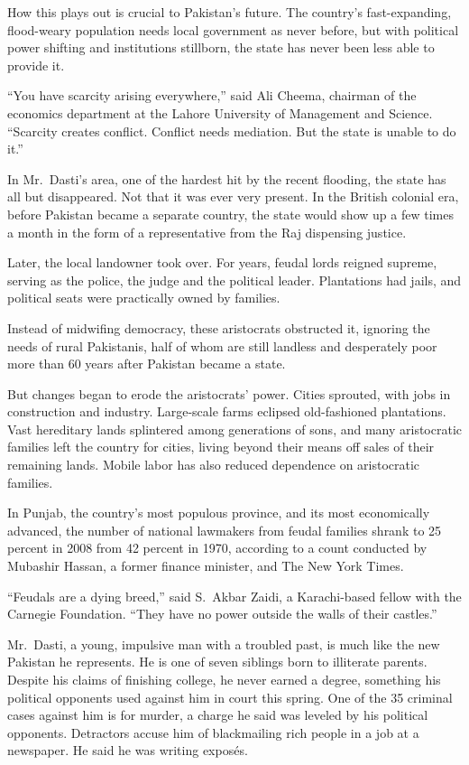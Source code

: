 ﻿\documentclass[12pt]{article}
\begin{document}
How this plays out is crucial to Pakistan's future. The country's fast-expanding, flood-weary
population needs local government as never before, but with political power shifting and
institutions stillborn, the state has never been less able to provide it.

``You have scarcity arising everywhere,'' said Ali Cheema, chairman of the economics department at
the Lahore University of Management and Science. ``Scarcity creates conflict. Conflict needs
mediation. But the state is unable to do it.''

In Mr.~Dasti's area, one of the hardest hit by the recent flooding, the state has all but
disappeared. Not that it was ever very present. In the British colonial era, before Pakistan became
a separate country, the state would show up a few times a month in the form of a representative from
the Raj dispensing justice.

Later, the local landowner took over. For years, feudal lords reigned supreme, serving as the
police, the judge and the political leader. Plantations had jails, and political seats were
practically owned by families.

Instead of midwifing democracy, these aristocrats obstructed it, ignoring the needs of rural
Pakistanis, half of whom are still landless and desperately poor more than 60 years after Pakistan
became a state.

But changes began to erode the aristocrats' power. Cities sprouted, with jobs in construction and
industry. Large-scale farms eclipsed old-fashioned plantations. Vast hereditary lands splintered
among generations of sons, and many aristocratic families left the country for cities, living beyond
their means off sales of their remaining lands. Mobile labor has also reduced dependence on
aristocratic families.

In Punjab, the country's most populous province, and its most economically advanced, the number of
national lawmakers from feudal families shrank to 25 percent in 2008 from 42 percent in 1970,
according to a count conducted by Mubashir Hassan, a former finance minister, and The New York
Times.

``Feudals are a dying breed,'' said S.~Akbar Zaidi, a Karachi-based fellow with the Carnegie
Foundation. ``They have no power outside the walls of their castles.''

Mr.~Dasti, a young, impulsive man with a troubled past, is much like the new Pakistan he represents.
He is one of seven siblings born to illiterate parents. Despite his claims of finishing college, he
never earned a degree, something his political opponents used against him in court this spring. One
of the 35 criminal cases against him is for murder, a charge he said was leveled by his political
opponents. Detractors accuse him of blackmailing rich people in a job at a newspaper. He said he was
writing expos\'es.
\end{document}
